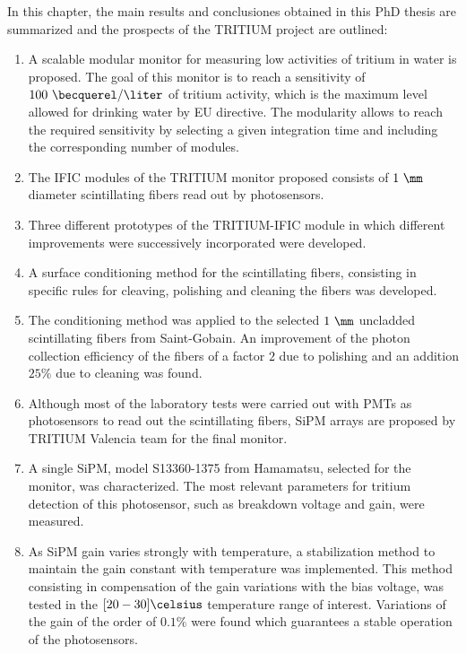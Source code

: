 In this chapter, the main results and conclusiones obtained in this PhD thesis are summarized and the prospects of the TRITIUM project are outlined:

\begin{enumerate}
\item{} A scalable modular monitor for measuring low activities of tritium in water is proposed. The goal of this monitor is to reach a sensitivity of $100~\becquerel/\liter$ of tritium activity, which is the maximum level allowed for drinking water by EU directive. The modularity allows to reach the required sensitivity by selecting a given integration time and including the corresponding number of modules.

\item{} The IFIC modules of the TRITIUM monitor proposed consists of $1~\mm$ diameter scintillating fibers read out by photosensors.

\item{} Three different prototypes of the TRITIUM-IFIC module in which different improvements were successively incorporated were developed.

\item{} A surface conditioning method for the scintillating fibers, consisting in specific rules for cleaving, polishing and cleaning the fibers was developed.

\item{} The conditioning method was applied to the selected $1~\mm$ uncladded scintillating fibers from Saint-Gobain. An improvement of the photon collection efficiency of the fibers of a factor $2$ due to polishing and an addition $25\%$ due to cleaning was found.

\item{} Although most of the laboratory tests were carried out with PMTs as photosensors to read out the scintillating fibers, SiPM arrays are proposed by TRITIUM Valencia team for the final monitor. 

\item{} A single SiPM, model S13360-1375 from Hamamatsu, selected for the monitor, was characterized. The most relevant parameters for tritium detection of this photosensor, such as breakdown voltage and gain, were measured.

\item{} As SiPM gain varies strongly with temperature, a stabilization method to maintain the gain constant with temperature was implemented. This method consisting in compensation of the gain variations with the bias voltage, was tested in the $[20-30]\celsius$ temperature range of interest. Variations of the gain of the order of $0.1\%$ were found which guarantees a stable operation of the photosensors.


\end{enumerate}
